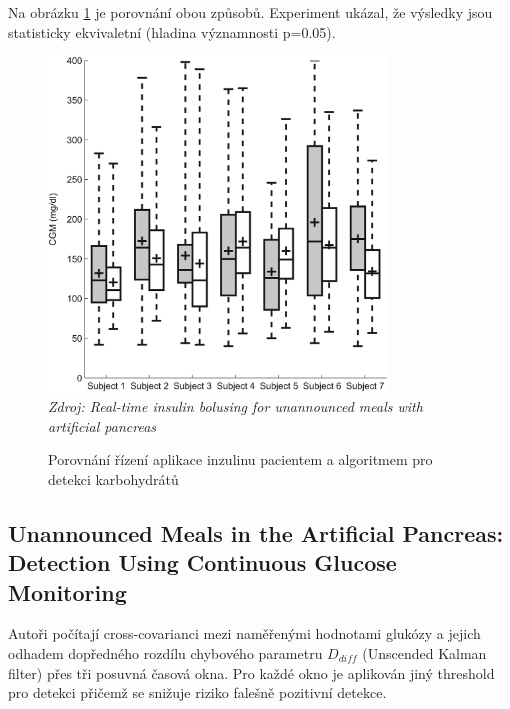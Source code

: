 Na obrázku \ref{fig:turksoy2} je porovnání obou způsobů. Experiment ukázal, že výsledky jsou statisticky ekvivaletní (hladina významnosti p=0.05).

\begin{figure}[H]
\caption{Porovnání řízení aplikace inzulinu pacientem a algoritmem pro detekci karbohydrátů}
\label{fig:turksoy2}
\centering
\includegraphics[width=0.8\textwidth]{img/analyza/turksoy3.jpg}\\
\textit{Zdroj: Real-time insulin bolusing for unannounced meals with artificial pancreas \citep{Analyza.Turksoy}}
\end{figure}


\subsection{Unannounced Meals in the Artificial Pancreas: Detection Using Continuous Glucose Monitoring}
\label{ch:CrossCovariance}

Autoři \citet{Analyza.CrossCovariance} počítají cross-covarianci mezi naměřenými hodnotami glukózy a jejich odhadem dopředného rozdílu chybového parametru $D_{diff}$ (Unscended Kalman filter) přes tři posuvná časová okna. Pro každé okno je aplikován jiný threshold pro detekci přičemž se snižuje riziko falešně pozitivní detekce.


